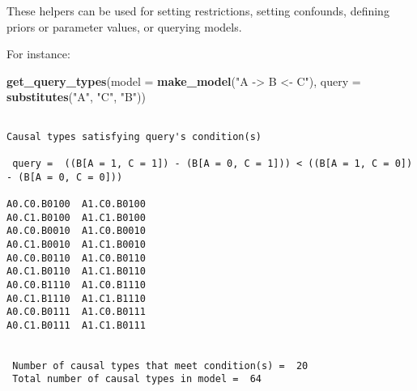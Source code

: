 \documentclass[
  12pt,
]{book}
\newenvironment{Shaded}{\begin{snugshade}}{\end{snugshade}}
\newcommand{\AttributeTok}[1]{\textcolor[rgb]{0.13,0.29,0.53}{#1}}
\newcommand{\FunctionTok}[1]{\textcolor[rgb]{0.13,0.29,0.53}{\textbf{#1}}}
\newcommand{\NormalTok}[1]{#1}
\newcommand{\StringTok}[1]{\textcolor[rgb]{0.31,0.60,0.02}{#1}}
\begin{document}
These helpers can be used for setting restrictions, setting confounds, defining priors or parameter values, or querying models.

For instance:

\begin{Shaded}
\begin{Highlighting}[]
\FunctionTok{get\_query\_types}\NormalTok{(}\AttributeTok{model =} \FunctionTok{make\_model}\NormalTok{(}\StringTok{"A {-}\textgreater{} B \textless{}{-} C"}\NormalTok{),}
         \AttributeTok{query =} \FunctionTok{substitutes}\NormalTok{(}\StringTok{"A"}\NormalTok{, }\StringTok{"C"}\NormalTok{, }\StringTok{"B"}\NormalTok{))}
\end{Highlighting}
\end{Shaded}

\begin{verbatim}

Causal types satisfying query's condition(s)  

 query =  ((B[A = 1, C = 1]) - (B[A = 0, C = 1])) < ((B[A = 1, C = 0]) - (B[A = 0, C = 0])) 

A0.C0.B0100  A1.C0.B0100
A0.C1.B0100  A1.C1.B0100
A0.C0.B0010  A1.C0.B0010
A0.C1.B0010  A1.C1.B0010
A0.C0.B0110  A1.C0.B0110
A0.C1.B0110  A1.C1.B0110
A0.C0.B1110  A1.C0.B1110
A0.C1.B1110  A1.C1.B1110
A0.C0.B0111  A1.C0.B0111
A0.C1.B0111  A1.C1.B0111


 Number of causal types that meet condition(s) =  20
 Total number of causal types in model =  64
\end{verbatim}

  
\end{document}
